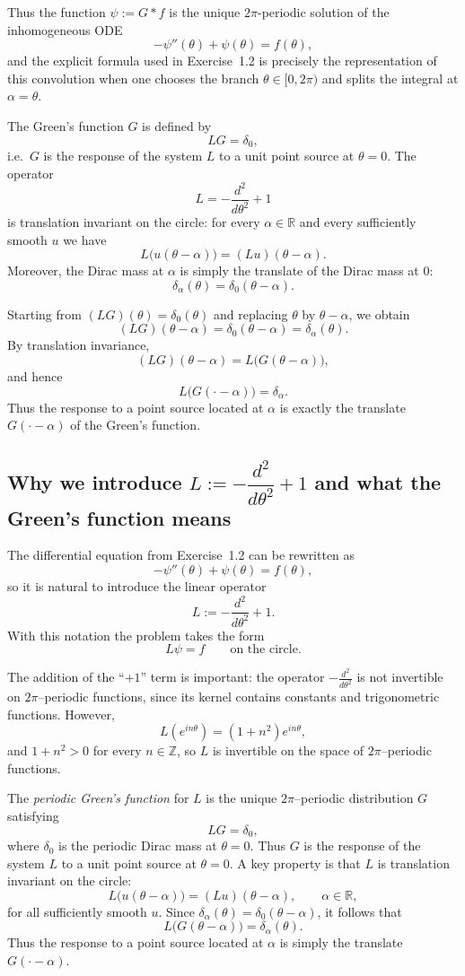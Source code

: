 \documentclass[12pt,a4paper]{article}
\theoremstyle{plain}
\theoremstyle{definition}
\theoremstyle{remark}
\theoremstyle{remark}
\begin{document}
Thus the function $\psi:=G*f$ is the unique $2\pi$-periodic solution of
the inhomogeneous ODE
\[
-\psi''(\theta) + \psi(\theta) = f(\theta),
\]
and the explicit formula used in Exercise~1.2 is precisely the
representation of this convolution when one chooses the branch
$\theta\in[0,2\pi)$ and splits the integral at $\alpha=\theta$.

The Green's function $G$ is defined by
\[
LG = \delta_0,
\]
i.e.\ $G$ is the response of the system $L$ to a unit point source at
$\theta=0$. The operator
\[
L = -\frac{d^2}{d\theta^2} + 1
\]
is translation invariant on the circle: for every $\alpha\in\mathbb{R}$ and
every sufficiently smooth $u$ we have
\[
L\big(u(\theta-\alpha)\big) = (Lu)(\theta-\alpha).
\]
Moreover, the Dirac mass at $\alpha$ is simply the translate of the Dirac
mass at $0$:
\[
\delta_\alpha(\theta) = \delta_0(\theta-\alpha).
\]

Starting from $(LG)(\theta)=\delta_0(\theta)$ and replacing $\theta$ by
$\theta-\alpha$, we obtain
\[
(LG)(\theta-\alpha) = \delta_0(\theta-\alpha) = \delta_\alpha(\theta).
\]
By translation invariance,
\[
(LG)(\theta-\alpha) = L\big(G(\theta-\alpha)\big),
\]
and hence
\[
L\big(G(\cdot-\alpha)\big) = \delta_\alpha.
\]
Thus the response to a point source located at $\alpha$ is exactly the
translate $G(\cdot-\alpha)$ of the Green's function.


\subsection*{Why we introduce $L := -\dfrac{d^2}{d\theta^2} + 1$ and what the Green's function means}

The differential equation from Exercise~1.2 can be rewritten as
\[
-\psi''(\theta) + \psi(\theta) = f(\theta),
\]
so it is natural to introduce the linear operator
\[
L := -\frac{d^2}{d\theta^2} + 1.
\]
With this notation the problem takes the form
\[
L\psi = f \qquad \text{on the circle}.
\]

The addition of the ``$+1$'' term is important: the operator
$-\frac{d^2}{d\theta^2}$ is not invertible on $2\pi$--periodic functions,
since its kernel contains constants and trigonometric functions.
However,
\[
L(e^{in\theta}) = (1+n^2)e^{in\theta},
\]
and $1+n^2>0$ for every $n\in\mathbb{Z}$, so $L$ is invertible on the
space of $2\pi$--periodic functions.

\medskip

The \emph{periodic Green's function} for $L$ is the unique $2\pi$--periodic
distribution $G$ satisfying
\[
LG = \delta_0,
\]
where $\delta_0$ is the periodic Dirac mass at $\theta=0$.  Thus $G$ is
the response of the system $L$ to a unit point source at $\theta=0$.  A
key property is that $L$ is translation invariant on the circle:
\[
L\big(u(\theta-\alpha)\big) = (Lu)(\theta-\alpha),
\qquad \alpha\in\mathbb{R},
\]
for all sufficiently smooth $u$.  Since
$\delta_\alpha(\theta)=\delta_0(\theta-\alpha)$, it follows that
\[
L\big(G(\theta-\alpha)\big) = \delta_\alpha(\theta).
\]
Thus the response to a point source located at $\alpha$ is simply the
translate $G(\cdot-\alpha)$.
\end{document}
